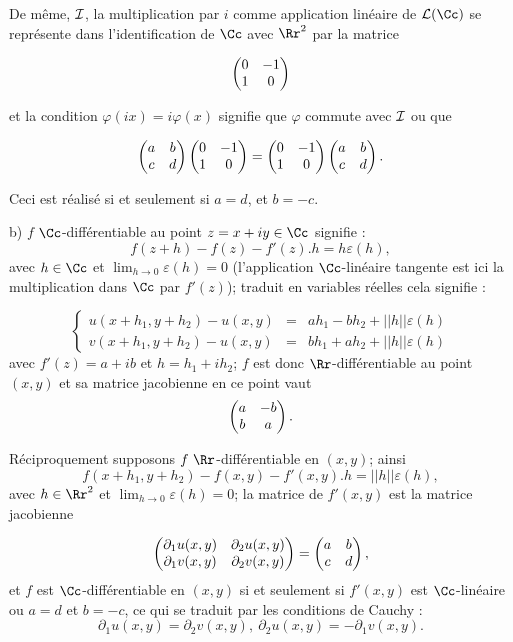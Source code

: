 {\begin{enumerate}
{De même, $\cal I$, la multiplication par $i$ comme application linéaire de 
${\cal L}(\Cc)$ se représente dans l'identification de $\Cc$ avec $\Rr^2$
par la matrice

$$\begin{pmatrix}0&-1\cr 1&0 \cr \end{pmatrix}$$

et la condition  $\varphi(ix)=i\varphi(x)$ signifie que $\varphi$ commute
avec $\cal I$ ou que 

$$\begin{pmatrix}a&b\cr c&d \cr\end{pmatrix}
\begin{pmatrix}0&-1\cr 1&0 \cr \end{pmatrix}=
\begin{pmatrix}0&-1\cr 1&0 \cr\end{pmatrix}
\begin{pmatrix}a&b\cr c&d \cr \end{pmatrix}.$$

Ceci est réalisé si et seulement si $a=d$, et $b=-c$.

\smallskip

b) $f$ $\Cc$-différentiable au point $z=x+iy\in \Cc$ signifie : 
$$f(z+h)-f(z)-f'(z).h=h\varepsilon(h),$$ avec $h\in\Cc$ et $\lim_{h\to
0}\varepsilon(h)=0$ (l'application 
$\Cc$-linéaire tangente est ici la multiplication dans $\Cc$ par $f'(z)$);
traduit en variables réelles cela signifie :

$$\left \{
\begin{array}{ccc} 
u(x+h_1,y+h_2)-u(x,y)&=&ah_1-bh_2+ ||h||
\varepsilon(h)\\
v(x+h_1,y+h_2)-u(x,y)&=&bh_1+ah_2+ ||h||
\varepsilon(h)
\end{array}\right.$$
avec $f'(z)=a+ib$ et $h=h_1+ih_2$; 
$f$ est donc $\Rr$-différentiable au point $(x,y)$  et sa
matrice jacobienne en ce point vaut 
$$\begin{pmatrix}a&-b\cr b&a \cr \end{pmatrix}.$$

Réciproquement supposons $f\  \Rr$-différentiable
en $(x,y)$; ainsi
$$f(x+h_1,y+h_2)-f(x,y)-f'(x,y).h=||h||
\varepsilon(h),$$
avec
$h\in\Rr^2$ et $\lim_{h\to
0}\varepsilon(h)=0$; la matrice de $f'(x,y)$ est la matrice jacobienne 

$$\begin{pmatrix}\partial_1u(x,y)&\partial_2u(x,y)\cr \partial_1v(x,y)&
\partial_2v(x,y) \cr \end{pmatrix}=\begin{pmatrix}a&b\cr c&d \cr \end{pmatrix},$$ et $f$ est  
$\Cc$-différentiable en
$(x,y)$ 
si et seulement si $f'(x,y)$ est $\Cc$-linéaire ou  $a=d$ et $b=-c$, ce qui se
traduit par les conditions de Cauchy : 
$$\partial_1u(x,y)=\partial_2v(x,y),\ \partial_2u(x,y)=-\partial_1v(x,y).$$

}
\end{enumerate}}
